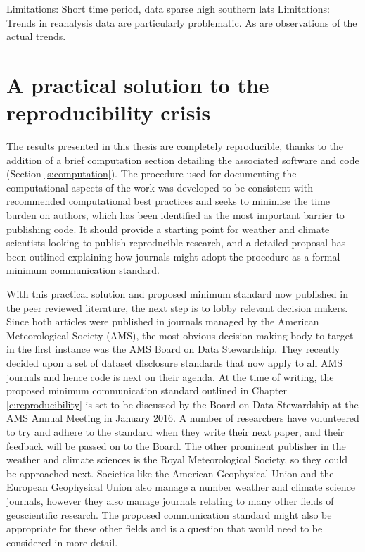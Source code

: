 Limitations: Short time period, data sparse high southern lats
Limitations: Trends in reanalysis data are particularly problematic. As are observations of the actual trends.


\section{A practical solution to the reproducibility crisis}

The results presented in this thesis are completely reproducible, thanks to the addition of a brief computation section detailing the associated software and code (Section \ref{s:computation}). The procedure used for documenting the computational aspects of the work was developed to be consistent with recommended computational best practices and seeks to minimise the time burden on authors, which has been identified as the most important barrier to publishing code. It should provide a starting point for weather and climate scientists looking to publish reproducible research, and a detailed proposal has been outlined explaining how journals might adopt the procedure as a formal minimum communication standard.

With this practical solution \citep{IrvingSimmonds2015} and proposed minimum standard \citep{IrvingBAMS2016} now published in the peer reviewed literature, the next step is to lobby relevant decision makers. Since both articles were published in journals managed by the American Meteorological Society (AMS), the most obvious decision making body to target in the first instance was the AMS Board on Data Stewardship. They recently decided upon a set of dataset disclosure standards that now apply to all AMS journals \citep{Mayernik2015} and hence code is next on their agenda. At the time of writing, the proposed minimum communication standard outlined in Chapter \ref{c:reproducibility} is set to be discussed by the Board on Data Stewardship at the AMS Annual Meeting in January 2016. A number of researchers have volunteered to try and adhere to the standard when they write their next paper, and their feedback will be passed on to the Board. The other prominent publisher in the weather and climate sciences is the Royal Meteorological Society, so they could be approached next. Societies like the American Geophysical Union and the European Geophysical Union also manage a number weather and climate science journals, however they also manage journals relating to many other fields of geoscientific research. The proposed communication standard might also be appropriate for these other fields and is a question that would need to be considered in more detail.


